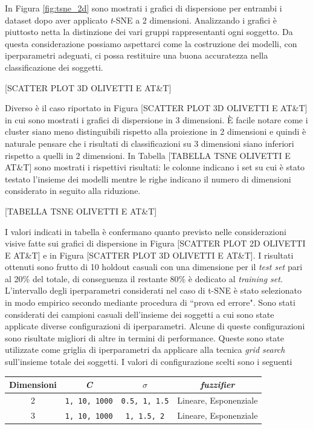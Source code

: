 \documentclass[12pt,italian]{report}
\begin{document}
In Figura \ref{fig:tsne_2d} sono mostrati i grafici di dispersione per entrambi i dataset dopo aver applicato \emph{t}-SNE a 2 dimensioni. Analizzando i grafici è piuttosto netta la distinzione dei vari gruppi rappresentanti ogni soggetto. Da questa considerazione possiamo aspettarci come la costruzione dei modelli, con  iperparametri adeguati, ci possa restituire una buona accuratezza nella classificazione dei soggetti.

[SCATTER PLOT 3D OLIVETTI E AT\&T]

Diverso è il caso riportato in Figura [SCATTER PLOT 3D OLIVETTI E AT\&T] in cui sono mostrati i grafici di dispersione in 3 dimensioni. È facile notare come i cluster siano meno distinguibili rispetto alla proiezione in 2 dimensioni e quindi è naturale pensare che i risultati di classificazioni su 3 dimensioni siano inferiori rispetto a quelli in 2 dimensioni. In Tabella [TABELLA TSNE OLIVETTI E AT\&T] sono mostrati i rispettivi risultati: le colonne indicano i set su cui è stato testato l'insieme dei modelli mentre le righe indicano il numero di dimensioni considerato in seguito alla riduzione.

[TABELLA TSNE OLIVETTI E AT\&T]

I valori indicati in tabella è confermano quanto previsto nelle considerazioni visive fatte sui grafici di dispersione in Figura [SCATTER PLOT 2D OLIVETTI E AT\&T] e in Figura [SCATTER PLOT 3D OLIVETTI E AT\&T]. I risultati ottenuti sono frutto di 10 holdout casuali con una dimensione per il \emph{test set} pari al 20\% del totale, di conseguenza il restante 80\% è dedicato al \emph{training set}. 
L'intervallo degli iperparametri considerati nel caso di t-SNE è stato selezionato in modo empirico secondo mediante procedura di ``prova ed errore". Sono stati considerati dei campioni casuali dell'insieme dei soggetti a cui sono state applicate diverse configurazioni di iperparametri. Alcune di queste configurazioni sono risultate migliori di altre in termini di performance. Queste sono state utilizzate come griglia di iperparametri da applicare alla tecnica \emph{grid search} sull'insieme totale dei soggetti. I valori di configurazione scelti sono i seguenti 


\begin{table}[h!]
	\centering
	\begin{tabular}{|c|c|c|c|}
		\hline
		Dimensioni & \emph{C}           & $ \sigma $       & \emph{fuzzifier}             \\ \hline
		2 & \texttt{1, 10, 1000} & \texttt{0.5, 1, 1.5} & Lineare, Esponenziale \\ \hline
		3 & \texttt{1, 10, 1000} & \texttt{1, 1.5, 2}   & Lineare, Esponenziale \\ \hline
	\end{tabular}
\end{table}
\end{document}
